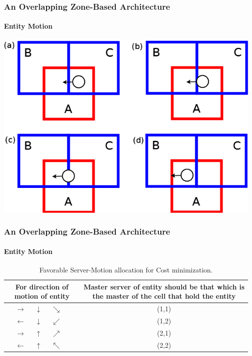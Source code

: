 
\begin{frame}[fragile]
\frametitle{An Overlapping Zone-Based Architecture}
\framesubtitle{Entity Motion}
\begin{center}
\includegraphics[scale=.80]{motion.png}
\end{center}
\end{frame}

\begin{frame}[fragile]
\frametitle{An Overlapping Zone-Based Architecture}
\framesubtitle{Entity Motion}
\begin{center}
\begin{table}
\caption{Favorable Server-Motion allocation for Cost minimization.}
\begin{tabular}{|c|c|}
\hline
\parbox[t]{4cm}{For direction of motion of entity} &
\parbox[t]{4cm}{Master server of entity should be that
which is the master of the cell that hold the entity} \\
\hline
$\longrightarrow\quad$ $\downarrow\quad$ $\searrow\quad$ & (1,1) \\
\hline
$\longleftarrow\quad$ $\downarrow\quad$ $\swarrow\quad$ & (1,2) \\
\hline
$\longrightarrow\quad$ $\uparrow\quad$ $\nearrow\quad$ & (2,1) \\
\hline
$\longleftarrow\quad$ $\uparrow\quad$ $\nwarrow\quad$ & (2,2) \\
\hline
\end{tabular}
\end{table}
\end{center}
\end{frame}

